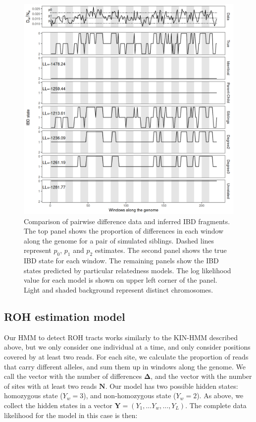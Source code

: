 \documentclass[12pt, letterpaper]{article}
\begin{document}
\begin{figure}[h!]
    \includegraphics[width=16cm]{plots/plotimg/IBDplot.png}
    \centering
    \caption{Comparison of pairwise difference data and inferred IBD fragments. The top panel shows the proportion of differences in each window along the genome for a pair of simulated siblings. Dashed lines represent $p_0$, $p_1$ and $p_2$ estimates. The second panel shows the true IBD state for each window. The remaining panels show the IBD states predicted by particular relatedness models. The log likelihood value for each model is shown on upper left corner of the panel. Light and shaded background represent distinct chromosomes.}
    \label{fig1:ibd}
\end{figure}

\subsection{ROH estimation model}\label{roh}
Our HMM to detect ROH tracts works similarly to the KIN-HMM described above, but we only consider one individual at a time, and only consider positions covered by at least two reads. For each site, we calculate the proportion of reads that carry different alleles, and sum them up in windows along the genome. We call the vector with the number of differences $\mathbf{\Delta}$, and the vector with the number of sites with at least two reads $\mathbf{N}$. Our model has two possible hidden states: homozygous state ($Y_w=3$), and non-homozygous state ($Y_w=2$). As above, we collect the hidden states in a vector $\mathbf{Y} = (Y_1, \dots Y_w, \dots, Y_L)$. The complete data likelihood for the model in this case is then:
\end{document}

